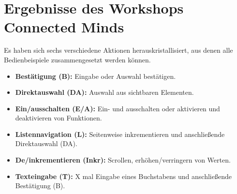 \section[Ergebnisse des Workshops]{Ergebnisse des Workshops Connected Minds}
Es haben sich sechs verschiedene Aktionen herauskristallisiert, aus denen alle Bedienbeispiele zusammengesetzt werden können.
\begin{itemize}
	\item \textbf{Bestätigung (B):} Eingabe oder Auswahl bestätigen.
	\item \textbf{Direktauswahl (DA):} Auswahl aus sichtbaren Elementen.
	\item \textbf{Ein/ausschalten (E/A):} Ein- und ausschalten oder aktivieren und deaktivieren von Funktionen.
	\item \textbf{Listennavigation (L):} Seitenweise inkrementieren und anschließende Direktauswahl (DA).
	\item \textbf{De/inkrementieren (Inkr):}  Scrollen, erhöhen/verringern von Werten.
	\item \textbf{Texteingabe (T):}  X mal Eingabe eines Buchstabens und anschließende Bestätigung (B).
\end{itemize}

